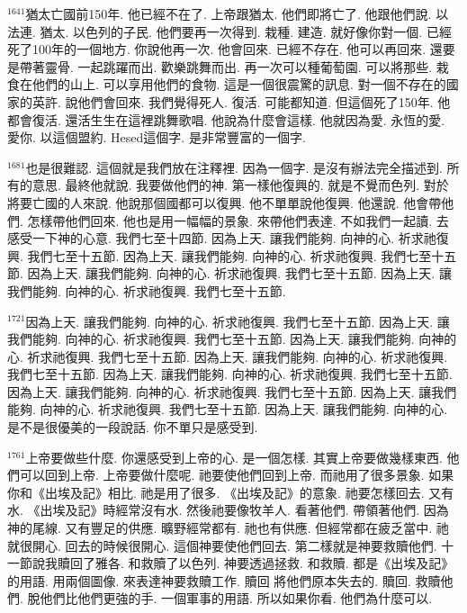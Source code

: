 \documentclass{book}
\begin{document}
$^{1641}$猶太亡國前150年.
他已經不在了.
上帝跟猶太.
他們即將亡了.
他跟他們說.
以法連.
猶太.
以色列的子民.
他們要再一次得到.
栽種.
建造.
就好像你對一個.
已經死了100年的一個地方.
你說他再一次.
他會回來.
已經不存在.
他可以再回來.
還要是帶著靈骨.
一起跳躍而出.
歡樂跳舞而出.
再一次可以種葡萄園.
可以將那些.
栽食在他們的山上.
可以享用他們的食物.
這是一個很震驚的訊息.
對一個不存在的國家的英許.
說他們會回來.
我們覺得死人.
復活.
可能都知道.
但這個死了150年.
他都會復活.
還活生生在這裡跳舞歌唱.
他說為什麼會這樣.
他就因為愛.
永恆的愛.
愛你.
以這個盟約.
Hesed這個字.
是非常豐富的一個字.

$^{1681}$也是很難認.
這個就是我們放在注釋裡.
因為一個字.
是沒有辦法完全描述到.
所有的意思.
最終他就說.
我要做他們的神.
第一樣他復興的.
就是不覺而色列.
對於將要亡國的人來說.
他說那個國都可以復興.
他不單單說他復興.
他還說.
他會帶他們.
怎樣帶他們回來.
他也是用一幅幅的景象.
來帶他們表達.
不如我們一起讀.
去感受一下神的心意.
我們七至十四節.
因為上天.
讓我們能夠.
向神的心.
祈求祂復興.
我們七至十五節.
因為上天.
讓我們能夠.
向神的心.
祈求祂復興.
我們七至十五節.
因為上天.
讓我們能夠.
向神的心.
祈求祂復興.
我們七至十五節.
因為上天.
讓我們能夠.
向神的心.
祈求祂復興.
我們七至十五節.

$^{1721}$因為上天.
讓我們能夠.
向神的心.
祈求祂復興.
我們七至十五節.
因為上天.
讓我們能夠.
向神的心.
祈求祂復興.
我們七至十五節.
因為上天.
讓我們能夠.
向神的心.
祈求祂復興.
我們七至十五節.
因為上天.
讓我們能夠.
向神的心.
祈求祂復興.
我們七至十五節.
因為上天.
讓我們能夠.
向神的心.
祈求祂復興.
我們七至十五節.
因為上天.
讓我們能夠.
向神的心.
祈求祂復興.
我們七至十五節.
因為上天.
讓我們能夠.
向神的心.
祈求祂復興.
我們七至十五節.
因為上天.
讓我們能夠.
向神的心.
是不是很優美的一段說話.
你不單只是感受到.

$^{1761}$上帝要做些什麼.
你還感受到上帝的心.
是一個怎樣.
其實上帝要做幾樣東西.
他們可以回到上帝.
上帝要做什麼呢.
祂要使他們回到上帝.
而祂用了很多景象.
如果你和《出埃及記》相比.
祂是用了很多.
《出埃及記》的意象.
祂要怎樣回去.
又有水.
《出埃及記》時經常沒有水.
然後祂要像牧羊人.
看著他們.
帶領著他們.
因為神的尾線.
又有豐足的供應.
曠野經常都有.
祂也有供應.
但經常都在疲乏當中.
祂就很開心.
回去的時候很開心.
這個神要使他們回去.
第二樣就是神要救贖他們.
十一節說我贖回了雅各.
和救贖了以色列.
神要透過拯救.
和救贖.
都是《出埃及記》的用語.
用兩個圖像.
來表達神要救贖工作.
贖回 將他們原本失去的.
贖回.
救贖他們.
脫他們比他們更強的手.
一個軍事的用語.
所以如果你看.
他們為什麼可以.
\end{document}
